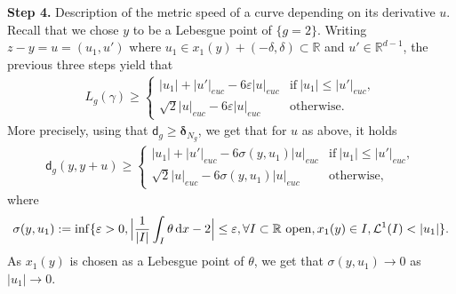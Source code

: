 \documentclass[a4paper,10pt]{article}
\numberwithin{equation}{section}
\newcommand{\R}{\mathbb{R}}
\newcommand{\e}{\varepsilon}
\newcommand{\sfd}{\mathsf d}
\newcommand{\di}{{\rm d}}
\begin{document}
\textbf{Step 4.} Description of the metric speed of a curve depending on its derivative $u$.\\
Recall that we chose $y$ to be a Lebesgue point of $\{g=2\}$.
Writing $z-y = u = (u_1, u')$ where $u_1 \in x_1(y)+(-\delta, \delta) \subset \R$ and $u' \in \R^{d-1}$, the previous three steps yield that
\begin{align*}
    L_g(\gamma) \geq \left\{ \begin{array}{ll}
           |u_1| + |u'|_{euc} - 6\e|u|_{euc} & \mathrm{if}\ |u_1| \leq |u'|_{euc}, \\
           \sqrt{2}|u|_{euc}- 6\e|u|_{euc}\  & \mathrm{otherwise}.
        \end{array}\right.
\end{align*}
More precisely, using that $\sfd_g \geq \boldsymbol{\delta}_{N_g}$, we get that for $u$ as above,  it holds
\begin{align}\label{asymptotic_lower_bound_metric_ex1}
    \sfd_g(y, y+u) \geq \left\{ \begin{array}{ll}
           |u_1| + |u'|_{euc} - 6\sigma(y, u_1)|u|_{euc} & \mathrm{if}\ |u_1| \leq |u'|_{euc}, \\
           \sqrt{2}|u|_{euc}- 6\sigma(y, u_1)|u|_{euc}\  & \mathrm{otherwise},
        \end{array}\right.
\end{align}
where 
\begin{align}
    \sigma(y, u_1) := \inf\{\e>0, \Big|\frac{1}{|I|}\int_I \theta \, \di x-2\Big| \leq \e, \forall I\subset \R\ \mathrm{open}, x_1(y) \in I, \mathcal{L}^1(I)< |u_1|\}.
\end{align}
As $x_1(y)$ is chosen as a Lebesgue point of $\theta$, we get that $\sigma(y, u_1) \to 0$ as $|u_1|\to 0$. 
\end{document}
